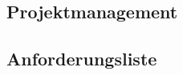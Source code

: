 \begin{landscape}
    \section{ Projektmanagement }
\subsection{ Anforderungsliste}


\end{landscape}

